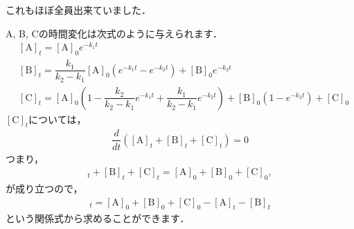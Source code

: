 \documentclass[11pt,a4]{jsarticle}
\numberwithin{equation}{section}
\begin{document}
これもほぼ全員出来ていました．

A, B, Cの時間変化は次式のように与えられます．
\begin{align*}
 &[\mathrm{A}]_t = [\mathrm{A}]_{0}e^{-k_1 t} \\ 
 &[\mathrm{B}]_t = \dfrac{k_1}{k_2 - k_1}[\mathrm{A}]_0 \left(e^{-k_1 t}-e^{-k_2 t}\right) + [\mathrm{B}]_0 e^{-k_2 t} \\
 & \left[\mathrm{C}\right]_{t}  =\left[\mathrm{A}\right]_{0}\left(1-\dfrac{k_{2}}{k_{2}-k_{1}}e^{-k_{1}t}+\dfrac{k_{1}}{k_{2}-k_{1}}e^{-k_{2}t}\right)+\left[\mathrm{B}\right]_{0}\left(1-e^{-k_{2}t}\right)+\left[\mathrm{C}\right]_{0}
\end{align*}
$[\mathrm{C}]_t$については，
\begin{align*}
 \dfrac{d}{dt}\left([\mathrm{A}]_t + [\mathrm{B}]_t + [\mathrm{C}]_t\right) = 0 
\end{align*}
つまり，
\begin{align*}
 [\mathrm{A}]_t + [\mathrm{B}]_t + [\mathrm{C}]_t =[\mathrm{A}]_0 + [\mathrm{B}]_0 + [\mathrm{C}]_0,
\end{align*}
が成り立つので，
\begin{align*}
 [\mathrm{C}]_t = [\mathrm{A}]_0 + [\mathrm{B}]_0 + [\mathrm{C}]_0 - [\mathrm{A}]_t - [\mathrm{B}]_t
\end{align*}
という関係式から求めることができます．
\end{document}
